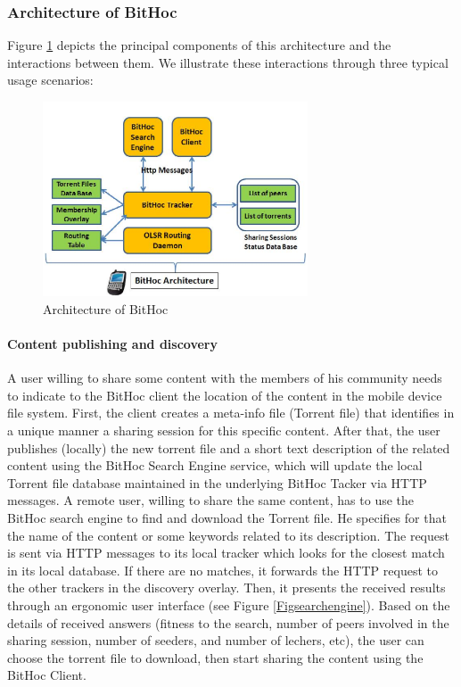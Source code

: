 \subsubsection{Architecture of BitHoc}
\label{secarchitecture}

Figure \ref{figarch} depicts the principal components of this architecture and the interactions between them. We illustrate these interactions through three typical usage scenarios:

\begin{figure}[!h]
  \begin{center}
    \includegraphics[width=0.7\textwidth]{Chapitre2/architecture.png}
  \end{center}
  \caption{Architecture of BitHoc}
  \label{figarch}
\end{figure}

\paragraph{Content publishing and discovery}

A user willing to share some content with the members of his community needs to indicate to the BitHoc client the location of the content in the mobile device file system. First, the client creates a meta-info file (Torrent file) that identifies in a unique manner a sharing session for this specific content. After that, the user publishes (locally) the new torrent file and a short text description of the related content using the BitHoc Search Engine service, which will update the local Torrent file database maintained in the underlying BitHoc Tacker via HTTP messages. A remote user, willing to share the same content, has to use the BitHoc search engine to find and download the Torrent file. He specifies for that the name of the content or some keywords related to its description. The request is sent via HTTP messages to its local tracker which looks for the closest match in its local database. If there are no matches, it forwards the HTTP request to the other trackers in the discovery overlay. Then, it presents the received results through an ergonomic user interface (see Figure \ref{Figsearchengine}). Based on the details of received answers (fitness to the search, number of peers involved in the sharing session, number of seeders, and number of lechers, etc), the user can choose the torrent file to download, then start sharing the content using the BitHoc Client.

